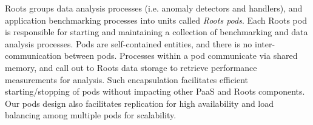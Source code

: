 
Roots groups data analysis processes (i.e. anomaly detectors and handlers), 
and application benchmarking processes into units called \textit{Roots pods}. 
Each Roots pod is responsible for starting and maintaining a collection of
benchmarking and data analysis processes. 
Pods are self-contained entities, and there is no inter-communication
between pods. 
Processes within a pod communicate via 
shared memory, and call out to Roots data storage to retrieve 
performance measurements for analysis. Such encapsulation facilitates 
efficient starting/stopping of pods 
without impacting other PaaS and Roots components. Our pods design also facilitates
replication for high availability and load balancing
among multiple pods for scalability.

